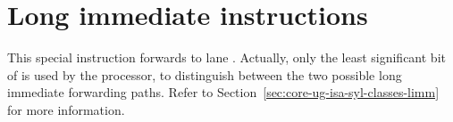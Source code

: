 
\section{Long immediate instructions}

\noasm{}
This special instruction forwards \code{\li} to lane \code{\lt}. Actually, only
the least significant bit of \code{\lt} is used by the processor, to distinguish
between the two possible long immediate forwarding paths. Refer to
Section~\ref{sec:core-ug-isa-syl-classes-limm} for more information.
